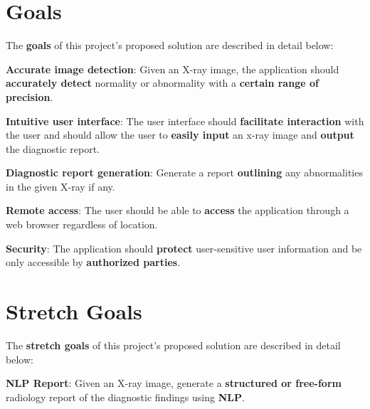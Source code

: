 \documentclass{article}
\begin{document}
\section{Goals}

The \textbf{goals} of this project's proposed solution are described in detail below:

\begin{itemize}
\begin{item}
\textbf{Accurate image detection}: Given an X-ray image, the application should \textbf{accurately detect} normality or abnormality with a \textbf{certain range of precision}.
\end{item}
\begin{item}
\textbf{Intuitive user interface}: The user interface should \textbf{facilitate interaction} with the user and should allow the user to \textbf{easily input} an x-ray image and \textbf{output} the diagnostic report.
\end{item}
\begin{item}
\textbf{Diagnostic report generation}: Generate a report \textbf{outlining} any abnormalities in the given X-ray if any. 
\end{item}
\begin{item}
\textbf{Remote access}: The user should be able to \textbf{access} the application through a web browser regardless of location.
\end{item}
\begin{item}
\textbf{Security}: The application should \textbf{protect} user-sensitive user information and be only accessible by \textbf{authorized parties}.
\end{item}
\end{itemize}

\section{Stretch Goals}

The \textbf{stretch goals} of this project's proposed solution are described in detail below:

\begin{itemize}
\begin{item}
\textbf{NLP Report}: Given an X-ray image, generate a \textbf{structured or free-form} radiology report of the diagnostic findings using \textbf{NLP}.
\end{item}
\end{itemize}
\end{document}
